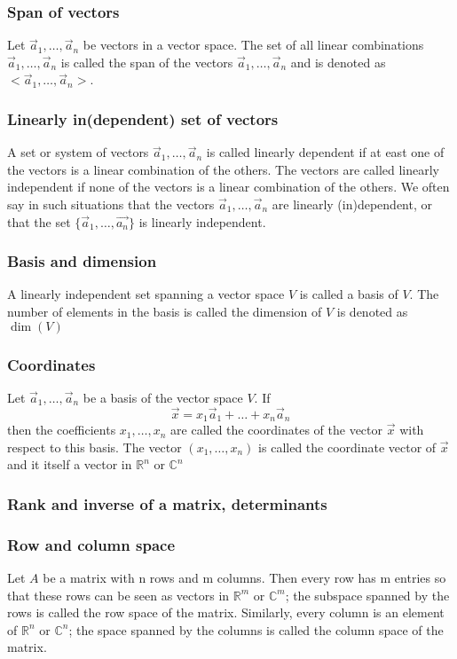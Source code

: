 \documentclass{article}
\begin{document}
			\subsubsection{Span of vectors}
			Let $\vec{a}_1,\dots,\vec{a}_n$ be vectors in a vector space. The set of all linear combinations $\vec{a}_1,\dots,\vec{a}_n$ is called the span of the vectors $\vec{a}_1,\dots,\vec{a}_n$ and is denoted as $<\vec{a}_1,\dots,\vec{a}_n>$.
			
			\subsubsection{Linearly in(dependent) set of vectors}
			A set or system of vectors $\vec{a}_1,\dots,\vec{a}_n$ is called linearly dependent if at east one of the vectors is a linear combination of the others. The vectors are called linearly independent if none of the vectors is a linear combination of the others. We often say in such situations that the vectors $\vec{a}_1,\dots,\vec{a}_n$ are linearly (in)dependent, or that the set $\{\vec{a}_1,\dots,\vec{a_n}\}$ is linearly independent.
			
			\subsubsection{Basis and dimension}
			A linearly independent set spanning a vector space $V$ is called a basis of $V$. The number of elements in the basis is called the dimension of $V$ is denoted as $\dim(V)$
			
			\subsubsection{Coordinates}
			Let $\vec{a}_1,\dots,\vec{a}_n$ be a basis of the vector space $V$. If 
			\begin{equation*}
				\vec{x} = x_1\vec{a}_1 + \dots + x_n\vec{a}_n
			\end{equation*}
			then the coefficients $x_1,\dots,x_n$ are called the coordinates of the vector $\vec{x}$ with respect to this basis. The vector $(x_1,\dots,x_n)$ is called the coordinate vector of $\vec{x}$ and it itself a vector in $\mathbb{R}^n$ or $\mathbb{C}^n$
			
		\subsubsection{Rank and inverse of a matrix, determinants}
			\subsubsection{Row and column space}
			Let $A$ be a matrix with n rows and m columns. Then every row has m entries so that these rows can be seen as vectors in $\mathbb{R}^m$ or $\mathbb{C}^m$; the subspace spanned by the rows is called the row space of the matrix. Similarly, every column is an element of $\mathbb{R}^n$ or $\mathbb{C}^n$; the space spanned by the columns is called the column space of the matrix.
			
\end{document}
